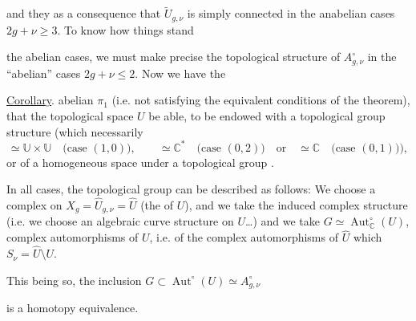 and they  as a consequence that $\widetilde U_{g,\nu}$ is simply connected in the anabelian cases $2g+\nu\geq3$. To know how things stand

 the abelian cases, we must make precise the topological structure of $A_{g,\nu}^{\circ}$ in the  ``abelian'' cases $2g+\nu\leq2$. Now we have the

\uline{Corollary}.   abelian $\pi_1$ (i.e. not satisfying the equivalent conditions of the theorem),  that the topological space $U$  be able,  to be endowed with a topological group structure (which  necessarily
\[
\simeq\mathbb U\times\mathbb U\quad\text{(case }(1,0)\text{)},\qquad
\simeq\mathbb C^*\quad\text{(case }(0,2)\text{)}\quad\text{or}\quad
\simeq\mathbb C\quad\text{(case }(0,1)\text{)}),
\]
or  of a homogeneous space under a topological group .

In all cases, the topological group  can be described as follows: We choose a complex   on $X_g=\widehat U_{g,\nu}=\widehat U$ (the   of $U$), and we take the induced complex structure  (i.e. we choose an algebraic  curve structure on $U$\ldots)
and we take $G\simeq\operatorname{Aut}_{\mathbb C}^{\circ}(U)$,      complex automorphisms of $U$, i.e. of the complex automorphisms of $\widehat U$ which  $S_\nu=\widehat U\setminus U$.

This being so, the inclusion $G\subset\operatorname{Aut}^{\circ}(U)\simeq A_{g,\nu}^{\circ}$

is a homotopy equivalence.

